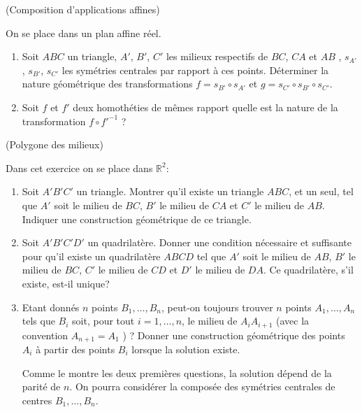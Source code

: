 \documentclass[a4paper,12pt,reqno]{amsart}
\begin{document}
\begin{exo} (Composition d'applications affines)

  On se place dans un plan affine réel.
  \begin{enumerate}
    \item Soit $ABC$ un triangle, $A'$, $B'$, $C'$ les milieux respectifs de $BC$, $CA$ et $AB$ , $s_{A'}$ , $s_{B'}$, $s_{C'}$ les symétries centrales par rapport à ces points. Déterminer la nature géométrique des transformations $f=s_{B'}\circ s_{A'}$ et $g=s_{C'}\circ s_{B'}\circ s_{C'}$.

    \item Soit $f$ et $f'$ deux homothéties de mêmes rapport quelle est la nature de la transformation $f\circ f'^{-1}$ ?
  \end{enumerate}
\end{exo}


\begin{exo} (Polygone des milieux)

  Dans cet exercice on se place dans $\mathbb{R}^{2}$:

  \begin{enumerate}
    \item Soit $A'B'C'$ un triangle. Montrer qu'il existe un triangle $ABC$, et un seul, tel que $A'$ soit le milieu de $BC$, $B'$ le milieu de $CA$ et $C'$ le milieu de $AB$. Indiquer une construction géométrique de ce triangle.

    \item Soit $A'B'C'D'$ un quadrilatère. Donner une condition nécessaire et suffisante pour qu'il existe un quadrilatère $ABCD$ tel que $A'$ soit le milieu de $AB$, $B'$ le milieu de $BC$, $C'$ le milieu de $CD$ et $D'$ le milieu de $DA$. Ce quadrilatère, s'il existe, est-il unique?

    \item\hard Etant donnés $n$ points $B_{1},\ldots,B_{n}$, peut-on toujours trouver $n$ points $A_{1},\ldots,A_{n}$ tels que $B_{i}$ soit, pour tout $i=1,\ldots,n$, le milieu de $A_{i}A_{i+1}$ (avec la convention $A_{n+1}=A_{1}$ ) ? Donner une construction géométrique des points $A_{i}$ à partir des points $B_{i}$ lorsque la solution existe.\newline
    \begin{indication}
      Comme le montre les deux premières questions, la solution dépend de la parité de $n$. On pourra considérer la composée des symétries centrales de centres $B_{1},\ldots,B_{n}$.
    \end{indication}

  \end{enumerate}
\end{exo}
\end{document}
